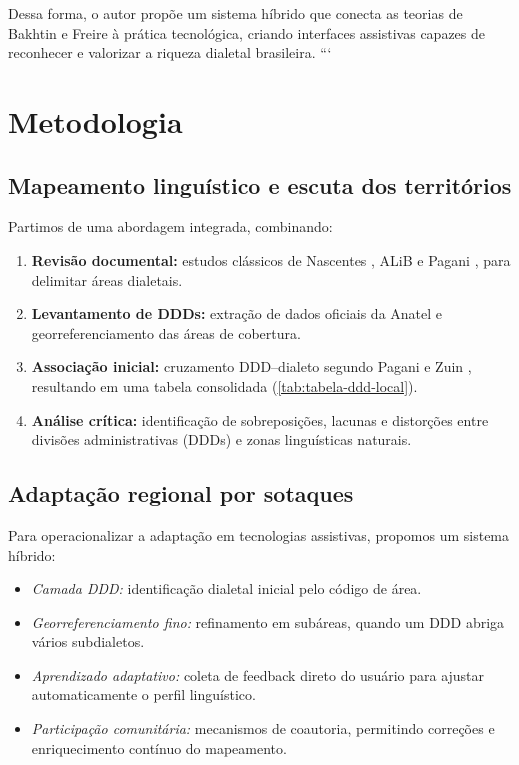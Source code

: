 Dessa forma, o autor propõe um sistema híbrido que conecta as teorias de Bakhtin e Freire à prática tecnológica, criando interfaces assistivas capazes de reconhecer e valorizar a riqueza dialetal brasileira. ```
\chapter{Metodologia}

\section{Mapeamento linguístico e escuta dos territórios}
Partimos de uma abordagem integrada, combinando:
\begin{enumerate}
  \item \textbf{Revisão documental:} estudos clássicos de Nascentes \cite{nascentes1953}, ALiB \cite{cardoso2014alib} e Pagani \cite{pagani2022}, para delimitar áreas dialetais.
  \item \textbf{Levantamento de DDDs:} extração de dados oficiais da Anatel \cite{anatel_pnb} e georreferenciamento das áreas de cobertura.
  \item \textbf{Associação inicial:} cruzamento DDD–dialeto segundo Pagani \cite{pagani2022} e Zuin \cite{zuin2021comunicacao}, resultando em uma tabela consolidada (\autoref{tab:tabela-ddd-local}).
  \item \textbf{Análise crítica:} identificação de sobreposições, lacunas e distorções entre divisões administrativas (DDDs) e zonas linguísticas naturais.
\end{enumerate}

\section{Adaptação regional por sotaques}
Para operacionalizar a adaptação em tecnologias assistivas, propomos um sistema híbrido:
\begin{itemize}
  \item \emph{Camada DDD:} identificação dialetal inicial pelo código de área.
  \item \emph{Georreferenciamento fino:} refinamento em subáreas, quando um DDD abriga vários subdialetos.
  \item \emph{Aprendizado adaptativo:} coleta de feedback direto do usuário para ajustar automaticamente o perfil linguístico.
  \item \emph{Participação comunitária:} mecanismos de coautoria, permitindo correções e enriquecimento contínuo do mapeamento.
\end{itemize}

